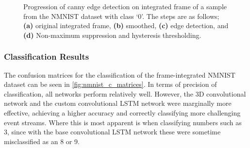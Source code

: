 \begin{figure}[htb]%
    \centering
    \qquad
    \qquad
    \qquad
    \caption{Progression of canny edge detection on integrated frame of a sample from the NMNIST dataset with class `0'. The steps are as follows; \textbf{(a)} original integrated frame, \textbf{(b)} smoothed, \textbf{(c)} edge detection, and \textbf{(d)} Non-maximum suppression and hysteresis thresholding.}%
    \label{fig:canny_edge_detection_nmnist}%
\end{figure}

\subsubsection{Classification Results}

The confusion matrices for the classification of the frame-integrated  NMNIST dataset can be seen in \cref{fig:nmnist_c_matrices}. In terms of precision of classification, all networks perform relatively well. However, the 3D convolutional network and the custom convolutional LSTM network were marginally more effective, achieving a higher accuracy and correctly classifying more challenging event streams. Where this is most apparent is when classifying numbers such as 3, since with the base convolutional LSTM network these were sometime misclassified as an 8 or 9.

